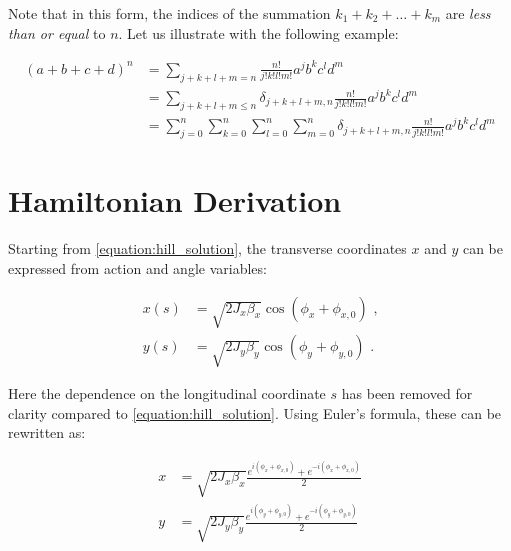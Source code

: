 Note that in this form, the indices of the summation \(k_1 + k_2 + \ldots + k_m\) are \emph{less than or equal} to \(n\).
Let us illustrate with the following example:

\begin{equation}
    \begin{aligned}
    (a + b + c + d)^n &= \sum_{j + k + l + m = n}  \frac{n!}{j! k! l! m!} a^j b^k c^l d^m  \\
                      &= \sum_{j + k + l + m \leq n} \delta_{j + k + l + m, n} \frac{n!}{j! k! l! m!} a^j b^k c^l d^m  \\
                      &= \sum^n_{j=0} \sum^n_{k=0} \sum^n_{l=0} \sum^n_{m=0} \delta_{j + k + l + m, n} \frac{n!}{j! k! l! m!} a^j b^k c^l d^m
    \end{aligned}
\end{equation}

\section{Hamiltonian Derivation}

Starting from \cref{equation:hill_solution}, the transverse coordinates \(x\) and \(y\) can be expressed from action and angle variables:

\begin{equation}
    \begin{aligned}
        x(s) &= \sqrt{2 J_x \beta_x} \cos \left( \phi_x + \phi_{x,0} \right) \text{ ,} \\
        y(s) &= \sqrt{2 J_y \beta_y} \cos \left( \phi_y + \phi_{y,0} \right) \text{ .}
    \end{aligned}
    \label{equation:hill_solution_xy_from_action_angle_variables}
\end{equation}

Here the dependence on the longitudinal coordinate \(s\) has been removed for clarity compared to \cref{equation:hill_solution}.
Using Euler's formula, these can be rewritten as:

\begin{equation}
    \begin{aligned}
        x &= \sqrt{2 J_x \beta_x} \frac{e^{i \left( \phi_x + \phi_{x,0} \right)} + e^{-i \left( \phi_x + \phi_{x,0} \right)}}{2} \\
        y &= \sqrt{2 J_y \beta_y} \frac{e^{i \left( \phi_y + \phi_{y,0} \right)} + e^{-i \left( \phi_y + \phi_{y,0} \right)}}{2} \\
    \end{aligned}
    \label{equation:hill_solution_xy_from_action_angle_variables_euler}
\end{equation}

